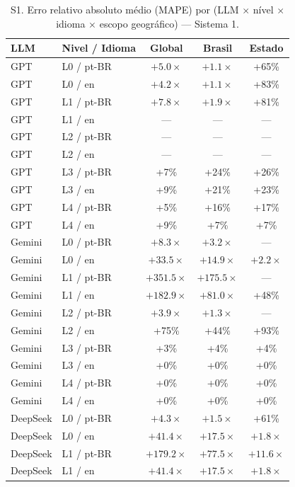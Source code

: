 \begin{table}[h]
\centering
\small
\caption{S1. Erro relativo absoluto m\'edio (MAPE) por (LLM $\times$ n\'ivel $\times$ idioma $\times$ escopo geogr\'afico) --- Sistema 1.}
\label{tab:sm_mape_s1}
\begin{tabular}{llccc}
\toprule
\textbf{LLM} & \textbf{Nivel / Idioma} & \textbf{Global} & \textbf{Brasil} & \textbf{Estado} \\
\midrule
GPT & L0 / pt-BR & $+5.0\times$ & $+1.1\times$ & +65\% \\
GPT & L0 / en & $+4.2\times$ & $+1.1\times$ & +83\% \\
GPT & L1 / pt-BR & $+7.8\times$ & $+1.9\times$ & +81\% \\
GPT & L1 / en & --- & --- & --- \\
GPT & L2 / pt-BR & --- & --- & --- \\
GPT & L2 / en & --- & --- & --- \\
GPT & L3 / pt-BR & +7\% & +24\% & +26\% \\
GPT & L3 / en & +9\% & +21\% & +23\% \\
GPT & L4 / pt-BR & +5\% & +16\% & +17\% \\
GPT & L4 / en & +9\% & +7\% & +7\% \\
\midrule
Gemini & L0 / pt-BR & $+8.3\times$ & $+3.2\times$ & --- \\
Gemini & L0 / en & $+33.5\times$ & $+14.9\times$ & $+2.2\times$ \\
Gemini & L1 / pt-BR & $+351.5\times$ & $+175.5\times$ & --- \\
Gemini & L1 / en & $+182.9\times$ & $+81.0\times$ & +48\% \\
Gemini & L2 / pt-BR & $+3.9\times$ & $+1.3\times$ & --- \\
Gemini & L2 / en & +75\% & +44\% & +93\% \\
Gemini & L3 / pt-BR & +3\% & +4\% & +4\% \\
Gemini & L3 / en & +0\% & +0\% & +0\% \\
Gemini & L4 / pt-BR & +0\% & +0\% & +0\% \\
Gemini & L4 / en & +0\% & +0\% & +0\% \\
\midrule
DeepSeek & L0 / pt-BR & $+4.3\times$ & $+1.5\times$ & +61\% \\
DeepSeek & L0 / en & $+41.4\times$ & $+17.5\times$ & $+1.8\times$ \\
DeepSeek & L1 / pt-BR & $+179.2\times$ & $+77.5\times$ & $+11.6\times$ \\
DeepSeek & L1 / en & $+41.4\times$ & $+17.5\times$ & $+1.8\times$ \\

\end{tabular}
\end{table}
